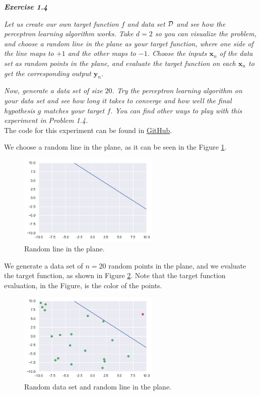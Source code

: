 \documentclass{article}
\begin{document}
    \bigskip

    \noindent \textbf{\textit{Exercise 1.4}}

    \noindent \textit{Let us create our own target function $f$ and data set $\cal{D}$ and see how the perceptron learning algorithm works.
    Take $d = 2$ so you can visualize the problem, and choose a random line in the plane as your target function, where one side of the line maps to $+1$ and the other maps to $-1$.
    Choose the inputs $\mathbf{x}_n$ of the data set as random points in the plane, and evaluate the target function on each $\mathbf{x}_n$ to get the corresponding output $\mathbf{y}_n$.}

    \noindent\textit{Now, generate a data set of size $20$. Try the perceptron learning algorithm on your data set and see how long it takes to converge and how well the final hypothesis $g$ matches your target $f$.
    You can find other ways to play with this experiment in Problem 1.4.} \\

    The code for this experiment can be found in \href{https://github.com/lucasresck/machine-learning/blob/main/notebooks/exercise_1.4.ipynb}{GitHub}.

    We choose a random line in the plane, as it can be seen in the Figure \ref{fig:random_line}.
    
    \begin{figure}[H]
        \centering
        \includegraphics[width=0.6\textwidth]{exercise_1.4_1.png}
        \caption{Random line in the plane.}
        \label{fig:random_line}
    \end{figure}

    We generate a data set of $n = 20$ random points in the plane, and we evaluate the target function, as shown in Figure \ref{fig:data_set}.
    Note that the target function evaluation, in the Figure, is the color of the points.
    
    \begin{figure}[H]
        \centering
        \includegraphics[width=0.6\textwidth]{exercise_1.4_2.png}
        \caption{Random data set and random line in the plane.}
        \label{fig:data_set}
    \end{figure}
\end{document}
